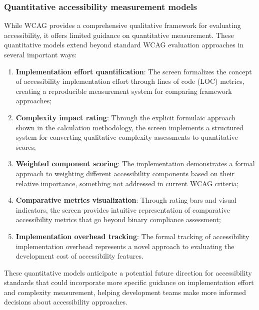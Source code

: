 \subsubsection{Quantitative accessibility measurement models}

While WCAG provides a comprehensive qualitative framework for evaluating accessibility, it offers limited guidance on quantitative measurement. These quantitative models extend beyond standard WCAG evaluation approaches in several important ways:

\begin{enumerate}
    \item \textbf{Implementation effort quantification}: The screen formalizes the concept of accessibility implementation effort through lines of code (LOC) metrics, creating a reproducible measurement system for comparing framework approaches;
    
    \item \textbf{Complexity impact rating}: Through the explicit formulaic approach shown in the calculation methodology, the screen implements a structured system for converting qualitative complexity assessments to quantitative scores;
    
    \item \textbf{Weighted component scoring}: The implementation demonstrates a formal approach to weighting different accessibility components based on their relative importance, something not addressed in current WCAG criteria;
    
    \item \textbf{Comparative metrics visualization}: Through rating bars and visual indicators, the screen provides intuitive representation of comparative accessibility metrics that go beyond binary compliance assessment;
    
    \item \textbf{Implementation overhead tracking}: The formal tracking of accessibility implementation overhead represents a novel approach to evaluating the development cost of accessibility features.
\end{enumerate}

These quantitative models anticipate a potential future direction for accessibility standards that could incorporate more specific guidance on implementation effort and complexity measurement, helping development teams make more informed decisions about accessibility approaches.

